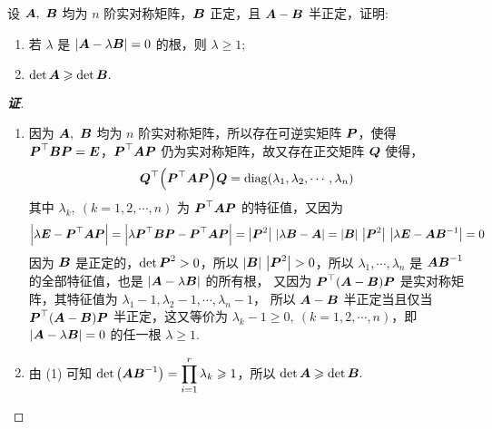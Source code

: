 \begin{example}[2014 南京大学]
    设 $\vb*{A},~\vb*{B}$ 均为 $n$ 阶实对称矩阵，$\vb*{B}$ 正定，且 $\vb*{A}-\vb*{B}$ 半正定，证明:
    \begin{enumerate}[label=(\arabic{*})]
        \item 若 $\lambda$ 是 $|\vb*{A}-\lambda\vb*{B}|=0$ 的根，则 $\lambda\geqslant 1$;
        \item $\det\vb*{A}\geqslant \det\vb*{B}.$
    \end{enumerate}
\end{example}
\begin{proof}[{\songti \textbf{证}}]
    \begin{enumerate}[label=(\arabic{*})]
        \item 因为 $\vb*{A},~\vb*{B}$ 均为 $n$ 阶实对称矩阵，所以存在可逆实矩阵 $\vb*{P}$，使得 $\vb*{P}^\top\vb*{BP}=\vb*{E}$，$\vb*{P}^\top\vb*{AP}$ 仍为实对称矩阵，故又存在正交矩阵 $\vb*{Q}$ 使得，
              $$\vb*{Q}^\top\qty(\vb*{P}^\top\vb*{AP})\vb*{Q}=\mathrm{diag}(\lambda_1,\lambda_2,\cdots,\lambda_n)$$
              其中 $\lambda_k,~(k=1,2,\cdots,n)$ 为 $\vb*{P}^\top\vb*{AP}$ 的特征值，又因为
              $$\qty|\lambda\vb*{E}-\vb*{P}^\top\vb*{AP}|=\qty|\lambda \vb*{P}^\top\vb*{BP}-\vb*{P}^\top\vb*{AP}|=\qty|\vb*{P}^2|~\qty|\lambda\vb*{B}-\vb*{A}|=|\vb*{B}|~\qty|\vb*{P}^2|~\qty|\lambda\vb*{E}-\vb*{AB}^{-1}|=0$$
              因为 $\vb*{B}$ 是正定的，$\det\vb*{P}^2>0$，所以 $|\vb*{B}|~\qty|\vb*{P}^2|>0$，所以 $\lambda_1,\cdots,\lambda_n$ 是 $\vb*{AB}^{-1}$ 的全部特征值，也是 $|\vb*{A}-\lambda\vb*{B}|$ 的所有根，
              又因为 $\vb*{P}^\top(\vb*{A}-\vb*{B})\vb*{P}$ 是实对称矩阵，其特征值为 $\lambda_1-1,\lambda_2-1,\cdots,\lambda_n-1$，
              所以 $\vb*{A}-\vb*{B}$ 半正定当且仅当 $\vb*{P}^\top(\vb*{A}-\vb*{B})\vb*{P}$ 半正定，这又等价为 $\lambda_k-1\geqslant 0,~(k=1,2,\cdots,n)$，即 $|\vb*{A}-\lambda\vb*{B}|=0$ 的任一根 $\lambda\geqslant 1.$
        \item 由 (1) 可知 $\det\qty(\vb*{AB}^{-1})=\displaystyle\prod_{i=1}^{r}\lambda_k\geqslant 1$，所以 $\det\vb*{A}\geqslant \det\vb*{B}.$
    \end{enumerate}
\end{proof}

